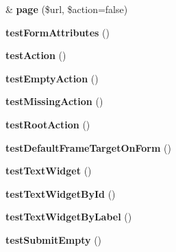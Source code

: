 \begin{DoxyCompactItemize}
\item 
\hypertarget{class_test_of_form_ab97d94cfa42cd20579e3bd121f30dc44}{
\& {\bfseries page} (\$url, \$action=false)}
\label{class_test_of_form_ab97d94cfa42cd20579e3bd121f30dc44}

\item 
\hypertarget{class_test_of_form_a21d2072ac9188a26888d7608a0355b43}{
{\bfseries testFormAttributes} ()}
\label{class_test_of_form_a21d2072ac9188a26888d7608a0355b43}

\item 
\hypertarget{class_test_of_form_a302019086b5c51f4a81760a530d0699e}{
{\bfseries testAction} ()}
\label{class_test_of_form_a302019086b5c51f4a81760a530d0699e}

\item 
\hypertarget{class_test_of_form_ac88d454421fe9602b9a7d7e7779bfefd}{
{\bfseries testEmptyAction} ()}
\label{class_test_of_form_ac88d454421fe9602b9a7d7e7779bfefd}

\item 
\hypertarget{class_test_of_form_ab94afbbfcf7a8c19dc65288b4083e0f2}{
{\bfseries testMissingAction} ()}
\label{class_test_of_form_ab94afbbfcf7a8c19dc65288b4083e0f2}

\item 
\hypertarget{class_test_of_form_ae539198363e18a955f41c81bfb04e244}{
{\bfseries testRootAction} ()}
\label{class_test_of_form_ae539198363e18a955f41c81bfb04e244}

\item 
\hypertarget{class_test_of_form_a2c7aea855fbce00dfc65e87526c53246}{
{\bfseries testDefaultFrameTargetOnForm} ()}
\label{class_test_of_form_a2c7aea855fbce00dfc65e87526c53246}

\item 
\hypertarget{class_test_of_form_aedff3e152d63861af3def897fcb0dc84}{
{\bfseries testTextWidget} ()}
\label{class_test_of_form_aedff3e152d63861af3def897fcb0dc84}

\item 
\hypertarget{class_test_of_form_ad8b3afb3c3281a5540f4c50fb4971800}{
{\bfseries testTextWidgetById} ()}
\label{class_test_of_form_ad8b3afb3c3281a5540f4c50fb4971800}

\item 
\hypertarget{class_test_of_form_a49d115ea54bff53387364c8e29745c8b}{
{\bfseries testTextWidgetByLabel} ()}
\label{class_test_of_form_a49d115ea54bff53387364c8e29745c8b}

\item 
\hypertarget{class_test_of_form_aa660f08de382cdb536a0763d6ba1f4d1}{
{\bfseries testSubmitEmpty} ()}
\label{class_test_of_form_aa660f08de382cdb536a0763d6ba1f4d1}


\end{DoxyCompactItemize}
